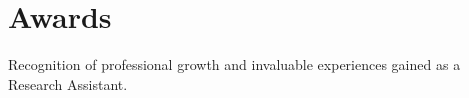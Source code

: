 \section{Awards}
  \resumeSubHeadingListStart
      {Recognition of professional growth and invaluable experiences gained as a Research Assistant.}
  \resumeSubHeadingListEnd